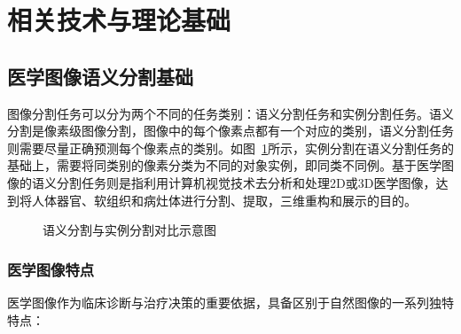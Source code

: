 \section{相关技术与理论基础}

\subsection{医学图像语义分割基础}

图像分割任务可以分为两个不同的任务类别：语义分割任务和实例分割任务\cite{azad2024}。语义分割是像素级图像分割，图像中的每个像素点都有一个对应的类别，语义分割任务则需要尽量正确预测每个像素点的类别。如图~\ref{fig:seg}所示，实例分割在语义分割任务的基础上，需要将同类别的像素分类为不同的对象实例，即同类不同例。基于医学图像的语义分割任务则是指利用计算机视觉技术去分析和处理2D或3D医学图像，达到将人体器官、软组织和病灶体进行分割、提取，三维重构和展示的目的\cite{liu2021}。

\begin{figure}[htbp]
    \centering
    \caption{语义分割与实例分割对比示意图\cite{kirillov2019}}
    \label{fig:seg}
\end{figure}

\subsubsection{医学图像特点}

医学图像作为临床诊断与治疗决策的重要依据，具备区别于自然图像的一系列独特特点：

